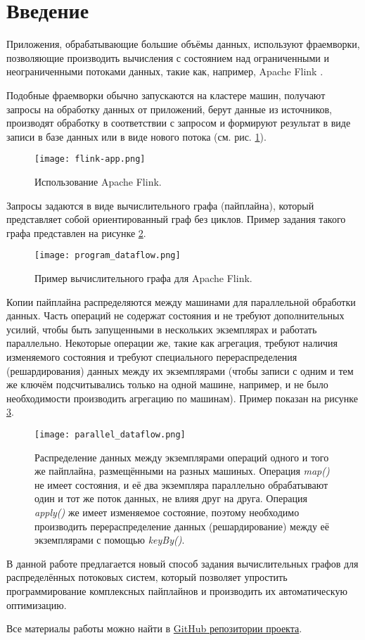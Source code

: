 \section{Введение}

Приложения, обрабатывающие большие объёмы данных, используют фраемворки, позволяющие производить вычисления с состоянием над ограниченными и неограниченными потоками данных, такие как, например, Apache Flink \cite{flink-org}.

Подобные фраемворки обычно запускаются на кластере машин, получают запросы на обработку данных от приложений, берут данные из источников, производят обработку в соответствии с запросом и формируют результат в виде записи в базе данных или в виде нового потока (см. рис. \ref{fig:flink-app}).

\begin{figure}[h]
    \texttt{[image: flink-app.png]}
    \caption{Использование Apache Flink.}
    \label{fig:flink-app}
\end{figure}

Запросы задаются в виде вычислительного графа (пайплайна), который представляет собой ориентированный граф без циклов. Пример задания такого графа представлен на рисунке \ref{fig:prog-data}.

\begin{figure}
    \texttt{[image: program\_dataflow.png]}
    \caption{Пример вычислительного графа для Apache Flink.}
    \label{fig:prog-data}
\end{figure}

Копии пайплайна распределяются между машинами для параллельной обработки данных.
Часть операций не содержат состояния и не требуют дополнительных усилий, чтобы быть запущенными в нескольких экземплярах и работать параллельно.
Некоторые операции же, такие как агрегация, требуют наличия изменяемого состояния и требуют специального перераспределения (решардирования) данных между их экземплярами (чтобы записи с одним и тем же ключём подсчитывались только на одной машине, например, и не было необходимости производить агрегацию по машинам). Пример показан на рисунке \ref{fig:par-data}.

\begin{figure}
    \texttt{[image: parallel\_dataflow.png]}
    \caption{Распределение данных между экземплярами операций одного и того же пайплайна, размещёнными на разных машиных. Операция \textit{map()} не имеет состояния, и её два экземпляра параллельно обрабатывают один и тот же поток данных, не влияя друг на друга. Операция \textit{apply()} же имеет изменяемое состояние, поэтому необходимо производить перераспределение данных (решардирование) между её экземплярами с помощью \textit{keyBy()}.}
    \label{fig:par-data}
\end{figure}

В данной работе предлагается новый способ задания вычислительных графов для распределённых потоковых систем, который позволяет упростить программирование комплексных пайплайнов и производить их автоматическую оптимизацию.

Все материалы работы можно найти в \href{https://github.com/winter-yuki/calco}{GitHub репозитории проекта}.
